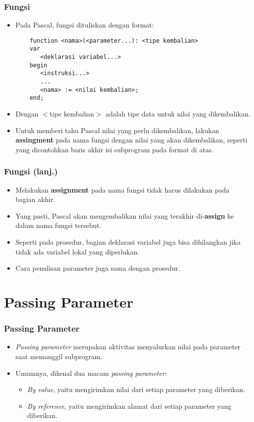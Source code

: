\documentclass{beamer}
\begin{document}
\begin{frame}[fragile]
\frametitle{Fungsi}
\begin{itemize}
    \item Pada Pascal, fungsi dituliskan dengan format:
    \begin{lstlisting}
    function <nama>(<parameter...): <tipe kembalian>
    var
       <deklarasi variabel...>
    begin
       <instruksi...>
       ...
       <nama> := <nilai kembalian>;
    end;
    \end{lstlisting}
    \item Dengan $<$tipe kembalian$>$ adalah tipe data untuk nilai yang dikembalikan.
    \item Untuk memberi tahu Pascal nilai yang perlu dikembalikan, lakukan \textbf{assingment} pada nama fungsi dengan nilai yang akan dikembalikan, seperti yang dicontohkan baris akhir isi subprogram pada format di atas.
\end{itemize}
\end{frame}

\begin{frame}
\frametitle{Fungsi (lanj.)}
\begin{itemize}
    \item Melakukan \textbf{assignment} pada nama fungsi tidak harus dilakukan pada bagian akhir.
    \item Yang pasti, Pascal akan mengembalikan nilai yang terakhir di-\textbf{assign} ke dalam nama fungsi tersebut.
    \item Seperti pada prosedur, bagian deklarasi variabel juga bisa dihilangkan jika tidak ada variabel lokal yang diperlukan.
    \item Cara penulisan parameter juga sama dengan prosedur.
\end{itemize}
\end{frame}

\section{Passing Parameter}
\frame{\sectionpage}

\begin{frame}
\frametitle{Passing Parameter}
\begin{itemize}
    \item \textit{Passing parameter} merupakan aktivitas menyalurkan nilai pada parameter saat memanggil subprogram.
    \item Umumnya, dikenal dua macam \textit{passing parameter}:
    \begin{itemize}
        \item \textit{By value}, yaitu mengirimkan \alert{nilai} dari setiap parameter yang diberikan.
        \item \textit{By reference}, yaitu mengirimkan \alert{alamat} dari setiap parameter yang diberikan.
    \end{itemize}
\end{itemize}
\end{frame}
\end{document}
